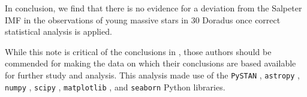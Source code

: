 \documentclass[apjl]{emulateapj}
\begin{document}
In conclusion, we find that there is no evidence for a deviation from the Salpeter IMF in the observations of young massive stars in 30 Doradus once correct statistical analysis is applied.

\acknowledgments

While this note is critical of the conclusions in \citet{Schneider:2018}, those
authors should be commended for making the data on which their conclusions are
based available for further study and analysis.  This analysis made use of the \texttt{PySTAN} \citep{PySTAN}, \texttt{astropy} \citep{astropy}, \texttt{numpy} \citep{numpy}, \texttt{scipy} \citep{scipy}, \texttt{matplotlib} \citep{matplotlib}, and \texttt{seaborn} \citep{seaborn} Python libraries.



\end{document}
